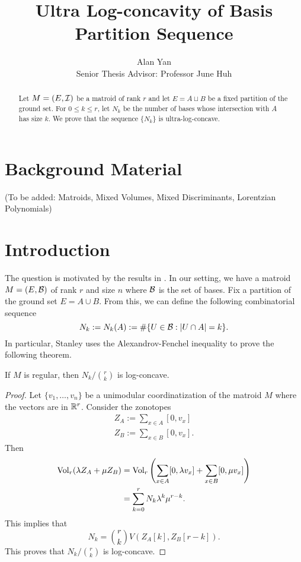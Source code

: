\documentclass[12pt]{article}
\title{Ultra Log-concavity of Basis Partition Sequence}
\author{Alan Yan \\ Senior Thesis Advisor: Professor June Huh}
\begin{document}
\maketitle

\begin{abstract}
	Let $M = (E, \mathcal{I})$ be a matroid of rank $r$ and let $E = A \sqcup B$ be a fixed partition of the ground set. For $0 \leq k \leq r$, let $N_k$ be the number of bases whose intersection with $A$ has size $k$. We prove that the sequence $\{N_k\}$ is ultra-log-concave. 
\end{abstract}
\tableofcontents

\newpage 

\section{Background Material}

(To be added: Matroids, Mixed Volumes, Mixed Discriminants, Lorentzian Polynomials)

\section{Introduction}

The question is motivated by the results in \cite{STANLEY}. In our setting, we have a matroid $M = (E, \mathcal{B})$ of rank $r$ and size $n$ where $\mathcal{B}$ is the set of bases. Fix a partition of the ground set $E = A \cup B$. From this, we can define the following combinatorial sequence
\[
	N_k := N_k(A) := \# \{U \in \mathcal{B} : |U \cap A| = k\}.
\]
In particular, Stanley uses the Alexandrov-Fenchel inequality to prove the following theorem. 
\begin{thm} \label{stanley-theorem}
	If $M$ is regular, then $N_k / \binom{r}{k}$ is log-concave. 
\end{thm}

\begin{proof}
	Let $\{v_1, \ldots, v_n\}$ be a unimodular coordinatization of the matroid $M$ where the vectors are in $\mathbb{R}^r$. Consider the zonotopes
	\begin{align*}
		Z_A := \sum_{x \in A} [0, v_x] \\
		Z_B := \sum_{x \in B} [0, v_x].
	\end{align*}
	Then 
	\begin{align*}
		\operatorname{Vol}_r (\lambda Z_A + \mu Z_B) & = \operatorname{Vol}_r \left ( \sum_{x \in A} [0, \lambda v_x] + \sum_{x \in B} [0, \mu v_x] \right ) \\
		& = \sum_{k = 0}^r N_k \lambda^k \mu^{r-k}.
	\end{align*}
	This implies that 
	\[
		N_k = \binom{r}{k} V(Z_A[k], Z_B[r-k]). 
	\]
	This proves that $N_k / \binom{r}{k}$ is log-concave. 
\end{proof}
\end{document}
